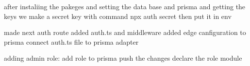 after instaliing the pakeges and setting the data base and prisma and getting the keys 
we make a secret key with command npx auth secret then put it in env 

made next auth route 
added auth.ts and middleware 
added edge canfiguration to prisma 
connect auth.ts file to prisma adapter 

adding admin role:
add role to prisma push the changes
declare the role module

